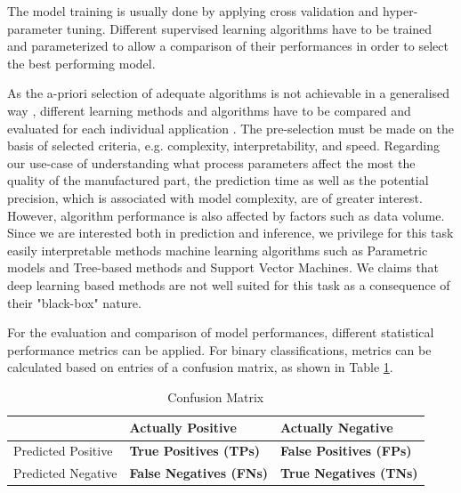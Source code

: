 
The model training is usually done by applying cross validation and hyper-parameter tuning. Different supervised learning algorithms have to be trained and parameterized to allow a comparison of their performances in order to select the best performing model. 

As the a-priori selection of adequate algorithms is not achievable in a generalised way \citep{kotthoff2016algorithm}, different learning methods and algorithms have to be compared and evaluated for each individual application \citep{lee2020machine}. The pre-selection must be made on the basis of selected criteria, e.g. complexity, interpretability, and speed. 
Regarding our use-case of understanding what process parameters affect the most the quality of the manufactured part, the prediction time as well as the potential precision, which is associated with model complexity, are of greater interest. However, algorithm performance is also affected by factors such as data volume. Since we are interested both in prediction and inference, we privilege for this task easily interpretable methods machine learning algorithms such as Parametric models and Tree-based methods and Support Vector Machines. We claims that deep  learning based methods are not well suited for this task as a consequence of their "black-box" nature.

For the evaluation and comparison of model performances, different statistical performance metrics can be applied. For binary classifications, metrics can be calculated based on entries of a confusion matrix, as shown in Table \ref{tab:confusion_matrix}.

\begin{table}[]
\label{tab:confusion_matrix}
\begin{tabular}{l|l|l|}
\cline{2-3}
                                         & Actually Positive              & Actually Negative              \\ \hline
\multicolumn{1}{|l|}{Predicted Positive} & \textbf{True Positives (TPs)}  & \textbf{False Positives (FPs)} \\ \hline
\multicolumn{1}{|l|}{Predicted Negative} & \textbf{False Negatives (FNs)} & \textbf{True Negatives (TNs)}  \\ \hline
\end{tabular}
\caption{Confusion Matrix}
\end{table}

